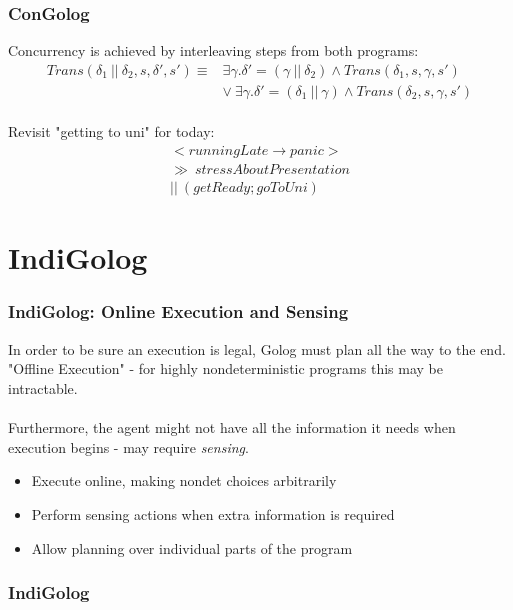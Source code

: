 \documentclass{beamer}
\begin{document}
\begin{frame}
\frametitle{ConGolog}
Concurrency is achieved by interleaving steps from both programs:
\[
\begin{array}{cc}
Trans(\delta_1\ ||\ \delta_2,s,\delta',s') \equiv & \exists \gamma . \delta'=(\gamma\ ||\ \delta_2)\wedge Trans(\delta_1,s,\gamma,s')\\
& \vee\ \exists \gamma . \delta'=(\delta_1\ ||\ \gamma)\wedge Trans(\delta_2,s,\gamma,s')
\end{array}\]
\pause
\ \\
Revisit "getting to uni" for today:
\[
\begin{array}{c}
<runningLate\rightarrow panic>\\
\gg\ stressAboutPresentation\\
||\ (getReady;goToUni)
\end{array}\]

\end{frame}

\section{IndiGolog}
\begin{frame}
\frametitle{IndiGolog: Online Execution and Sensing}
In order to be sure an execution is legal, Golog must plan all the way
to the end.  "Offline Execution" - for highly nondeterministic programs
this may be intractable.\\
\ \\
Furthermore, the agent might not have all the information it needs when
execution begins - may require \emph{sensing}.

\begin{itemize}
  \pause
  \item Execute online, making nondet choices arbitrarily
  \pause
  \item Perform sensing actions when extra information is required
  \pause
  \item Allow planning over individual parts of the program
\end{itemize}
\end{frame}

\begin{frame}
\frametitle{IndiGolog}

\end{frame}
\end{document}
